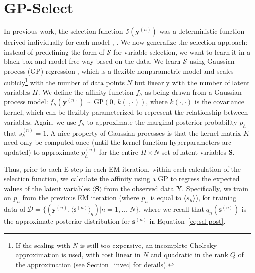 \documentclass[12pt]{article}
\renewcommand{\vec}[1]{{\mathbf{#1}}}
\newcommand{\Ss}{\mathcal{S}}
\begin{document}
\section{GP-Select}
\label{gp-select}
In previous work, the selection function $\mathcal{S}(\vec{y}^{(n)})$ 
was a deterministic function derived  individually for each model 
\citep[see e.g.][]{SheltonEtAl2011, SheltonEtAl2012, DaiLucke2012a, DaiLucke2012b,
BornscheinEtAl2013, SheikhEtAl2014, SheltonEtAl2015}, .
%
We now generalize the selection approach:
instead of predefining the form of $\Ss$ for variable selection, we want
to learn it in a black-box and model-free way based on the data.
%
We learn $\Ss$  using Gaussian process (GP) regression
\citep[e.g.][]{RasmussenGPbook}, which is a flexible nonparametric model 
and scales cubicly\footnote{If the scaling with $N$ is still too expensive, an incomplete Cholesky approximation is used, with cost linear in $N$ and quadratic in the rank $Q$ of the approximation (see Section~\ref{invec} for details).} with the number of data points $N$ but linearly with the number of latent variables $H$.  
We define the affinity function $f_h$ as being drawn from a Gaussian process model: 
$f_h(\vec{y}^{(n)}) \sim \text{GP}\left(0, \, k(\cdot,\cdot) \right)$, where $k(\cdot, \cdot)$ is the covariance kernel, 
which can be flexibly parameterized to represent the relationship between variables.
Again, we use $f_h$ to approximate the marginal posterior probability $p_h$ that $s_h^{(n)}=1$.
%
A nice property of Gaussian processes is that the kernel matrix $K$ need only be computed once (until the kernel function hyperparameters are updated) 
to approximate $p_h^{(n)}$ for the entire $H\times N$ set of latent variables $\vec{S}$. 

Thus, prior to each E-step in each EM iteration, within each calculation of the selection function, we calculate the affinity  using a GP to regress the expected values of the latent variables $\langle \vec{S} \rangle$ from the observed data $\vec{Y}$.  
Specifically, we train on $p_h$ from the previous EM iteration (where $p_h$ is equal to $\langle s_h \rangle$), for 
training data of 
$\mathcal{D} = \{ (\vec{y}^{(n)}, \langle\vec{s}^{(n)}\rangle_{q}) | n = 1,\dots, N \}$, 
where we recall that $q_{n}(\vec{s}^{(n)})$ is the approximate posterior distribution for $\vec{s}^{(n)}$ in Equation~\eqref{eq:sel-post}.
\end{document}
